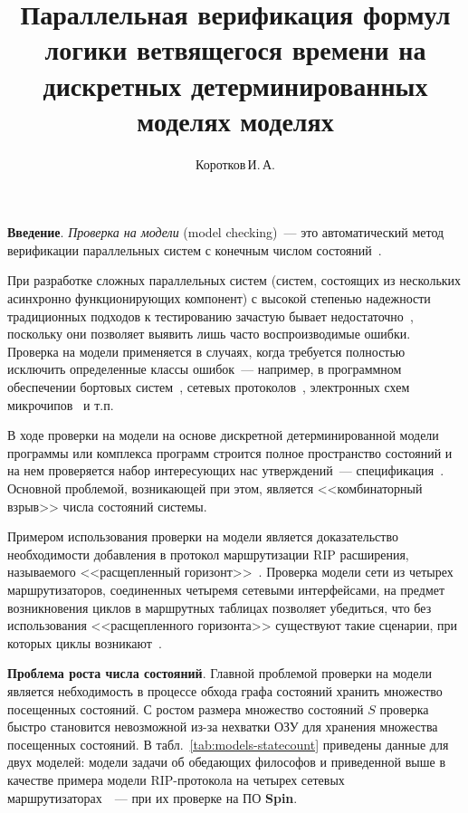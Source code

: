 \documentclass[a4paper,notitlepage,14pt]{article}
\title{Параллельная верификация формул логики ветвящегося времени на дискретных
  детерминированных моделях моделях} \author{Коротков\,И.\,А.}
\begin{document}
\maketitle

\textbf{Введение}. \emph{Проверка на модели} (model checking)~--- это автоматический метод верификации
параллельных систем с конечным числом состояний~\cite{Clarke}.

При разработке сложных параллельных систем (систем, состоящих из нескольких асинхронно
функционирующих компонент) с высокой степенью надежности традиционных подходов к
тестированию зачастую бывает недостаточно~\cite{Clarke}, поскольку они позволяет выявить
лишь часто воспроизводимые ошибки. Проверка на модели применяется в случаях, когда
требуется полностью исключить определенные классы ошибок~--- например, в программном
обеспечении бортовых систем~\cite{Havelund98formalanalysis,CamaraArincModel}, сетевых
протоколов~\cite{RipOnSpin}, электронных схем микрочипов~\cite{Glazberg_psl:beyond} и т.п.

В ходе проверки на модели на основе дискретной детерминированной модели программы или
комплекса программ строится полное пространство состояний и на нем проверяется набор
интересующих нас утверждений~--- спецификация~\cite{Velder}. Основной проблемой,
возникающей при этом, является <<комбинаторный взрыв>> числа состояний
системы\cite{Clarke}.

Примером использования проверки на модели является доказательство необходимости добавления
в протокол маршрутизации RIP расширения, называемого <<расщепленный
горизонт>>~\cite{Black00:IP}. Проверка модели сети из четырех маршрутизаторов, соединенных
четыремя сетевыми интерфейсами, на предмет возникновения циклов в маршрутных таблицах
позволяет убедиться, что без использования <<расщепленного горизонта>> существуют такие
сценарии, при которых циклы возникают~\cite{RipOnSpin}.



\textbf{Проблема роста числа состояний}. Главной проблемой проверки на модели является
небходимость в процессе обхода графа состояний хранить множество посещенных состояний. С
ростом размера множество состояний $S$ проверка быстро становится невозможной из-за
нехватки ОЗУ для хранения множества посещенных состояний. В
табл.~\ref{tab:models-statecount} приведены данные для двух моделей: модели задачи об
обедающих философов и приведенной выше в качестве примера модели RIP-протокола на четырех
сетевых маршрутизаторах~\cite{RipOnSpin}~--- при их проверке на ПО \textbf{Spin}.
\end{document}
